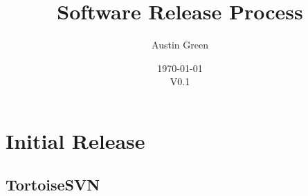 \documentclass[10pt]{article}
\title{Software Release Process}
\author{Austin Green}
\date{\today\\V0.1}
\begin{document}
    \begin{titlepage}
    \maketitle
    \thispagestyle{empty}
    \end{titlepage}

	\tableofcontents
	\newpage

    \section{Initial Release}
        \subsection{TortoiseSVN}
\end{document}
